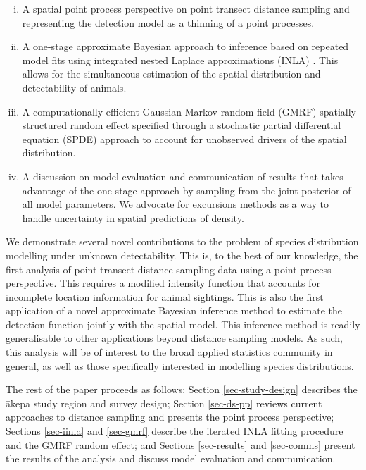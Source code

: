 \documentclass{stylefile16/statsoc}
\newcommand{\akepa}{\textquotesingle\={a}kepa}  %
\begin{document}
\begin{enumerate}[(i)]
	\item A spatial point process perspective on point transect distance sampling and representing the detection model as a thinning of a point processes.
	\item A one-stage approximate Bayesian approach to inference based on repeated model fits using integrated nested Laplace approximations (INLA) \citep{rue_approximate_2009}.  This allows for the simultaneous estimation of the spatial distribution and detectability of animals.
	\item A computationally efficient Gaussian Markov random field (GMRF) spatially structured random effect specified through a stochastic partial differential equation (SPDE) approach \citep{lindgren_explicit_2011} to account for unobserved drivers of the spatial distribution.
	\item A discussion on model evaluation and communication of results that takes advantage of the one-stage approach by sampling from the joint posterior of all model parameters. We advocate for excursions methods \citep{bolin_excursion_2015} as a way to handle uncertainty in spatial predictions of density.  
\end{enumerate}

We demonstrate several novel contributions to the problem of species distribution modelling under unknown detectability.  This is, to the best of our knowledge, the first analysis of point transect distance sampling data using a point process perspective.  This requires a modified intensity function that accounts for incomplete location information for animal sightings.  This is also the first application of a novel approximate Bayesian inference method to estimate the detection function jointly with the spatial model.  This inference method is readily generalisable to other applications beyond distance sampling models.  As such, this analysis will be of interest to the broad applied statistics community in general, as well as those specifically interested in modelling species distributions.

The rest of the paper proceeds as follows:  Section \ref{sec-study-design} describes the \akepa{} study region and survey design; Section \ref{sec-ds-pp} reviews current approaches to distance sampling and presents the point process perspective; Sections \ref{sec-iinla} and \ref{sec-gmrf} describe the iterated INLA fitting procedure and the GMRF random effect; and Sections \ref{sec-results} and \ref{sec-comms} present the results of the analysis and discuss model evaluation and communication.
\end{document}
